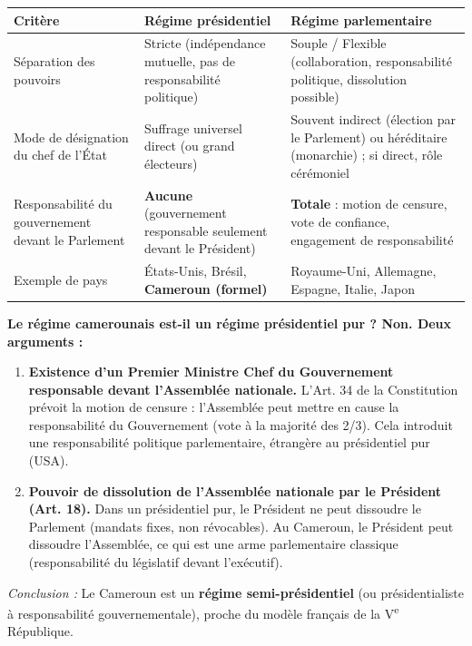 \documentclass[11pt]{article}
\begin{document}
\begin{corrige}
\begin{center}
\begin{tabularx}{\linewidth}{|l|X|X|}
\hline
\rowcolor{popblueL} \textbf{Critère} & \textbf{Régime présidentiel} & \textbf{Régime parlementaire} \\
\hline Séparation des pouvoirs & Stricte (indépendance mutuelle, pas de responsabilité politique) & Souple / Flexible (collaboration, responsabilité politique, dissolution possible) \\
\hline Mode de désignation du chef de l'État & Suffrage universel direct (ou grand électeurs) & Souvent indirect (élection par le Parlement) ou héréditaire (monarchie) ; si direct, rôle cérémoniel \\
\hline Responsabilité du gouvernement devant le Parlement & \textbf{Aucune} (gouvernement responsable seulement devant le Président) & \textbf{Totale} : motion de censure, vote de confiance, engagement de responsabilité \\
\hline Exemple de pays & États-Unis, Brésil, \textbf{Cameroun (formel)} & Royaume-Uni, Allemagne, Espagne, Italie, Japon \\
\hline
\end{tabularx}
\end{center}
\textbf{Le régime camerounais est-il un régime présidentiel pur ? \textbf{Non}. Deux arguments :}
\begin{enumerate}
\item \textbf{Existence d'un Premier Ministre Chef du Gouvernement responsable devant l'Assemblée nationale.} L'Art. 34 de la Constitution prévoit la motion de censure : l'Assemblée peut mettre en cause la responsabilité du Gouvernement (vote à la majorité des 2/3). Cela introduit une responsabilité politique parlementaire, étrangère au présidentiel pur (USA).
\item \textbf{Pouvoir de dissolution de l'Assemblée nationale par le Président (Art. 18).} Dans un présidentiel pur, le Président ne peut dissoudre le Parlement (mandats fixes, non révocables). Au Cameroun, le Président peut dissoudre l'Assemblée, ce qui est une arme parlementaire classique (responsabilité du législatif devant l'exécutif).
\end{enumerate}
\emph{Conclusion :} Le Cameroun est un \textbf{régime semi-présidentiel} (ou présidentialiste à responsabilité gouvernementale), proche du modèle français de la V\textsuperscript{e} République.
\end{corrige}
\end{document}
